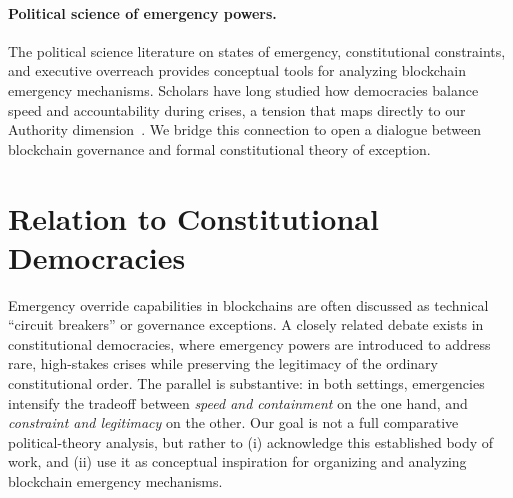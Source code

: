 \documentclass[12pt]{article}
\newif\ifconcise
\begin{document}
\paragraph{Political science of emergency powers.}
The political science literature on states of emergency, constitutional constraints, and executive overreach provides conceptual tools for analyzing blockchain emergency mechanisms. Scholars have long studied how democracies balance speed and accountability during crises, a tension that maps directly to our Authority dimension~\cite{ferejohn2004law, gimpelson2016law}. We bridge this connection to open a dialogue between blockchain governance and formal constitutional theory of exception.

\ifconcise\else
\section{Relation to Constitutional Democracies}
\label{sec:democracy-analogy}

Emergency override capabilities in blockchains are often discussed as technical ``circuit breakers'' or
governance exceptions. A closely related debate exists in constitutional democracies, where emergency
powers are introduced to address rare, high-stakes crises while preserving the legitimacy of the
ordinary constitutional order. The parallel is substantive: in both settings, emergencies intensify the
tradeoff between \emph{speed and containment} on the one hand, and \emph{constraint and legitimacy} on
the other. Our goal is not a full comparative political-theory analysis, but rather to (i) acknowledge
this established body of work, and (ii) use it as conceptual inspiration for organizing and analyzing
blockchain emergency mechanisms.
\end{document}
